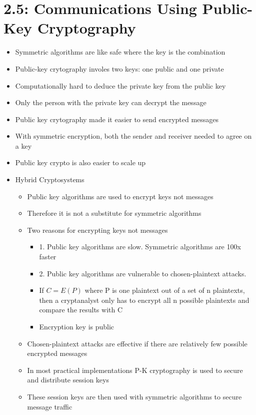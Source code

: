 \documentclass[]{article}
\begin{document}
\section{2.5: Communications Using Public-Key Cryptography}
\begin{itemize}
    \item Symmetric algorithms are like safe where the key is the combination
    \item Public-key crytography involes two keys: one public and one private
    \item Computationally hard to deduce the private key from the public key
    \item Only the person with the private key can decrypt the message
    \item Public key crytography made it easier to send encrypted messages
    \item With symmetric encryption, both the sender and receiver needed to agree on a key
    \item Public key crypto is also easier to scale up
    \item Hybrid Cryptosystems
    \begin{itemize}
        \item Public key algorithms are used to encrypt keys not messages
        \item Therefore it is not a substitute for symmetric algorithms
        \item Two reasons for encrypting keys not messages
        \begin{itemize}
            \item 1. Public key algorithms are slow. Symmetric algorithms are 100x faster
            \item 2. Public key algorithms are vulnerable to chosen-plaintext attacks. 
            \item If $C=E(P)$ where P is one plaintext out of a set of n plaintexts, then a cryptanalyst only has to encrypt all n possible plaintexts and compare the results with C
            \item Encryption key is public
        \end{itemize}
        \item Chosen-plaintext attacks are effective if there are relatively few possible encrypted messages
        \item In most practical implementations P-K cryptography is used to secure and distribute session keys
        \item These session keys are then used with symmetric algorithms to secure message traffic

\end{itemize}
\end{itemize}
\end{document}

